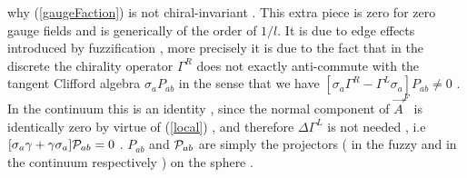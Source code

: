 \documentclass[a4paper,10pt]{article}
\begin{document}
why (\ref{gaugeFaction}) is not chiral-invariant . This extra piece is zero for zero gauge fields and is generically
of the order of $1/l$. It is due to  edge effects introduced by
fuzzification , more precisely it is due to the fact that in the
discrete the chirality operator ${\Gamma}^R$ does not exactly
anti-commute with the tangent Clifford algebra
${\sigma}_{a}P_{ab}$ in the sense that we have $
[{{\sigma}}_a{\Gamma}^R-{\Gamma}^L{{\sigma}}_a]P_{ab}{\neq}0$ .
In the continuum this is an identity , since the normal component of $\vec{A}^F$ is identically zero by virtue of (\ref{local}) , and therefore
${\Delta}{\Gamma}^L$ is not needed , i.e $[{{\sigma}}_a{\gamma}+{\gamma}{{\sigma}}_a]{\cal P}_{ab}=0$ . $P_{ab}$ and ${\cal P}_{ab}$ are simply the projectors ( in the fuzzy and in the continuum respectively ) on the sphere \cite{giorgio1,unp}.
\end{document}
